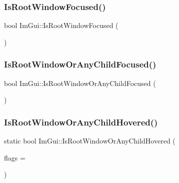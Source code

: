 \subsubsection{\texorpdfstring{Is\+Root\+Window\+Focused()}{IsRootWindowFocused()}}
{\footnotesize\ttfamily bool Im\+Gui\+::\+Is\+Root\+Window\+Focused (\begin{DoxyParamCaption}{ }\end{DoxyParamCaption})}

\hypertarget{namespace_im_gui_ad7175b87a80da527fb5ba5bc75993091}{}\label{namespace_im_gui_ad7175b87a80da527fb5ba5bc75993091} 
\subsubsection{\texorpdfstring{Is\+Root\+Window\+Or\+Any\+Child\+Focused()}{IsRootWindowOrAnyChildFocused()}}
{\footnotesize\ttfamily bool Im\+Gui\+::\+Is\+Root\+Window\+Or\+Any\+Child\+Focused (\begin{DoxyParamCaption}{ }\end{DoxyParamCaption})}

\hypertarget{namespace_im_gui_a048d3ecb7eb03f3416900dfbaac09d3f}{}\label{namespace_im_gui_a048d3ecb7eb03f3416900dfbaac09d3f} 
\subsubsection{\texorpdfstring{Is\+Root\+Window\+Or\+Any\+Child\+Hovered()}{IsRootWindowOrAnyChildHovered()}}
{\footnotesize\ttfamily static bool Im\+Gui\+::\+Is\+Root\+Window\+Or\+Any\+Child\+Hovered (\begin{DoxyParamCaption}\item[{Im\+Gui\+Hovered\+Flags}]{flags = {} }\end{DoxyParamCaption})\hspace{0.3cm}{\ttfamily [static]}}

\hypertarget{namespace_im_gui_a99fd14154aae264087d471132e56a42e}{}\label{namespace_im_gui_a99fd14154aae264087d471132e56a42e} 
